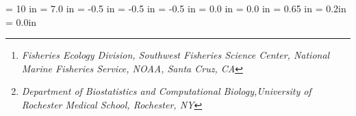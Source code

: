 \textwidth = 10 in
\textheight = 7.0 in
\oddsidemargin = -0.5 in
\evensidemargin = -0.5 in
\topmargin = -0.5 in
\headheight = 0.0 in
\headsep = 0.0 in
\footskip = 0.65 in
\parskip = 0.2in
\parindent = 0.0in


\makeatletter
\renewcommand{\thefigure}{\ifnum \c@chapter>\z@ \thechapter.\fi S\SupNum{}--\@arabic\c@figure}
\renewcommand*\l@figure{\@dottedtocline{1}{1.5em}{3.3em}}
\renewcommand{\thesection}{}
\renewcommand\section{\@startsection {section}{1}{-5.6mm}%
                                   {-3.5ex \@plus -1ex \@minus -.2ex}%
                                   {2.3ex \@plus.2ex}%
                                   {\normalfont\Large\bfseries}}

\makeatother


\newcommand{\ArticleName}{``An Assessment of Sibship Reconstruction \\
Programs with Simulated Microsatellite Data''}

\author{Eric C. Anderson\thanks{\em Fisheries Ecology Division, Southwest Fisheries Science Center, National Marine Fisheries Service, NOAA, Santa Cruz, CA} \and 
Anthony Almudevar\thanks{{\em Department of Biostatistics and Computational Biology,University of Rochester Medical School, Rochester, NY}}
}


